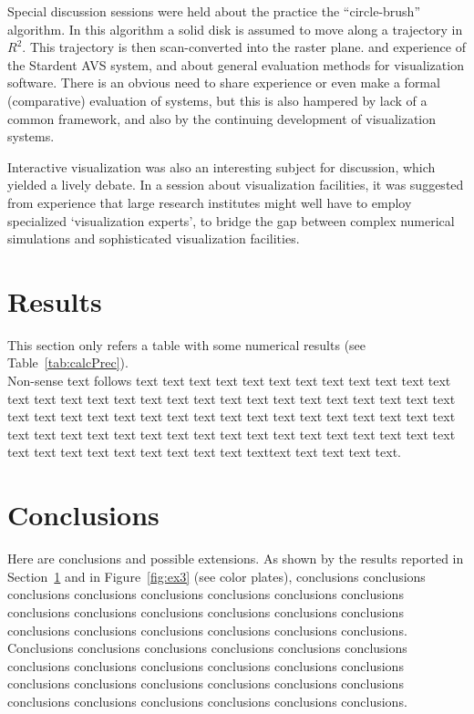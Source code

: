 \documentclass{egpubl}
\begin{document}
Special discussion sessions were held about the practice the ``circle-brush''
algorithm. In this algorithm a solid disk is assumed to move along a
trajectory in $R^2$. This trajectory is then scan-converted into the raster
plane. and experience of the Stardent AVS system, and about general
evaluation methods for visualization software. There is an obvious need to
share experience or even make a formal (comparative) evaluation of systems,
but this is also hampered by lack of a common framework, and also by the
continuing development of visualization systems.

Interactive visualization was also an interesting subject for discussion,
which yielded a lively debate\cite{yll}. In a session about visualization
facilities, it was suggested from experience that large research institutes
might well have to employ specialized `visualization experts', to bridge the
gap between complex numerical simulations and sophisticated visualization
facilities.


\section{Results}
\label{sec:results}

This section only refers a table with some numerical results (see
Table~\ref{tab:calcPrec}). \\
Non-sense text follows text text text text text text text text text text text
text text text text text text text text text text text text text text text
text text text text text text text text text text text text text text text
text text text text text text text text text text text text text text text
text text text text text text text text text text text text text text text
text texttext text text text text.


\section{Conclusions}
\label{sec:concl}

Here are conclusions and possible extensions. As shown by the results
reported in Section~\ref{sec:results} and in Figure~\ref{fig:ex3} (see color
plates), conclusions conclusions conclusions conclusions conclusions
conclusions conclusions conclusions conclusions conclusions conclusions
conclusions conclusions conclusions conclusions conclusions conclusions
conclusions conclusions conclusions. Conclusions conclusions conclusions
conclusions conclusions conclusions conclusions conclusions conclusions
conclusions conclusions conclusions conclusions conclusions conclusions
conclusions conclusions conclusions conclusions conclusions conclusions
conclusions conclusions conclusions.
\end{document}
